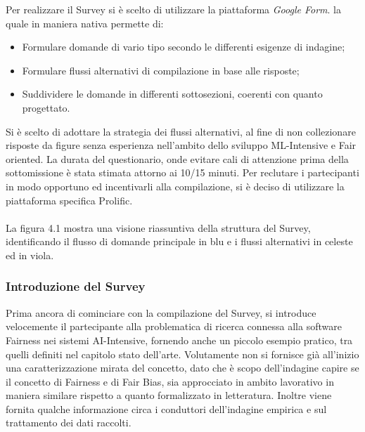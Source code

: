     Per realizzare il Survey si è scelto di utilizzare la piattaforma \emph{Google Form}. la quale in maniera nativa permette di:
    \
    \begin{itemize}
        \item Formulare domande di vario tipo secondo le differenti esigenze di indagine;
        \item Formulare flussi alternativi di compilazione in base alle risposte;
        \item Suddividere le domande in differenti sottosezioni, coerenti con quanto progettato.
    \end{itemize}
    
    Si è scelto di adottare la strategia dei flussi alternativi, al fine di non collezionare risposte da figure senza esperienza nell'ambito dello sviluppo ML-Intensive e Fair oriented. La durata del questionario, onde evitare cali di attenzione prima della sottomissione è stata stimata attorno ai 10/15 minuti. Per reclutare i partecipanti in modo opportuno ed incentivarli alla compilazione, si è deciso di utilizzare la piattaforma specifica Prolific.\\ \\
    
    La figura 4.1 mostra una visione riassuntiva della struttura del Survey, identificando il flusso di domande principale in blu e i flussi alternativi in celeste ed in viola. 
    
   \subsubsection{Introduzione del Survey}
   Prima ancora di cominciare con la  compilazione del Survey, si introduce velocemente il partecipante alla problematica di ricerca connessa alla software Fairness nei sistemi AI-Intensive, fornendo anche un piccolo esempio pratico, tra quelli definiti nel capitolo stato dell'arte. Volutamente non si fornisce già all'inizio una caratterizzazione mirata del concetto, dato che è scopo dell'indagine capire se il concetto di Fairness e di Fair Bias, sia approcciato in ambito lavorativo in maniera similare rispetto a quanto formalizzato in letteratura. Inoltre viene fornita qualche informazione circa i conduttori dell'indagine empirica e sul trattamento dei dati raccolti. 
   
   
   
